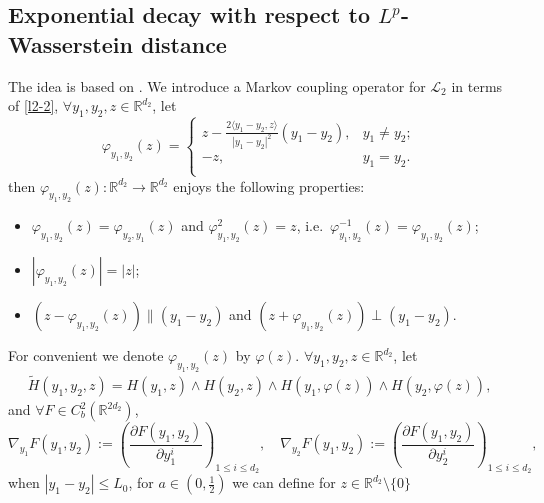 \documentclass[11pt,reqno]{amsart}
\numberwithin{equation}{section}
\newcommand{\R}{\mathbb{R}}
\begin{document}
\subsection{Exponential decay with respect to $L^p$-Wasserstein distance}\label{exp-con}
The idea is based on \cite{DW,JW2}. We introduce a Markov coupling operator for $\mathcal{L}_2$ in terms of \eqref{l2-2}, $\forall y_1,y_2,z\in\R^{d_2}$, let
$$\varphi_{y_1,y_2}(z)=
\begin{cases}
	z-\frac{2\langle y_1-y_2, z\rangle}{|y_1-y_2|^2}(y_1-y_2), & y_1\neq y_2;\\
	-z, &y_1=y_2.\\
\end{cases}
$$
then $\varphi_{y_1,y_2}(z):\R^{d_2}\to\R^{d_2}$ enjoys the following properties:
\begin{itemize}
	\item[(A1)] $\varphi_{y_1,y_2}(z)=\varphi_{y_2,y_1}(z)$ and $\varphi^2_{y_1,y_2}(z)=z$, i.e.\
	$\varphi_{y_1,y_2}^{-1}(z)=\varphi_{y_1,y_2}(z)$;
	\item[(A2)] $|\varphi_{y_1,y_2}(z)|=|z|$;
	\item[(A3)] $(z-\varphi_{y_1,y_2}(z))\parallel(y_1-y_2)$ and $(z+\varphi_{y_1,y_2}(z))\perp (y_1-y_2).$
\end{itemize}
For convenient we denote $\varphi_{y_1,y_2}(z)$ by $\varphi(z)$.  $\forall y_1,y_2,z\in\R^{d_2}$, let
\begin{align*}
\widetilde{H}(y_1,y_2,z)=H(y_1,z)\wedge H(y_2,z)\wedge H(y_1,\varphi(z))\wedge H(y_2,\varphi(z)),
\end{align*}
and $\forall F\in C^2_b(\R^{2d_2})$,
$$\nabla_{y_1}F(y_1,y_2):=\left(\frac{\partial F(y_1,y_2)}{\partial y_1^i}\right)_{1\le i\le d_2},\quad \nabla_{y_2}F(y_1,y_2):=
 \left(\frac{\partial F(y_1,y_2)}{\partial y_2^i}\right)_{1\le i\le d_2},$$
when $|y_1-y_2|\leq L_0$, for $a\in (0, \frac{1}{2})$ we can define for $ z\in\R^{d_2}\setminus\{0\}$
\end{document}
